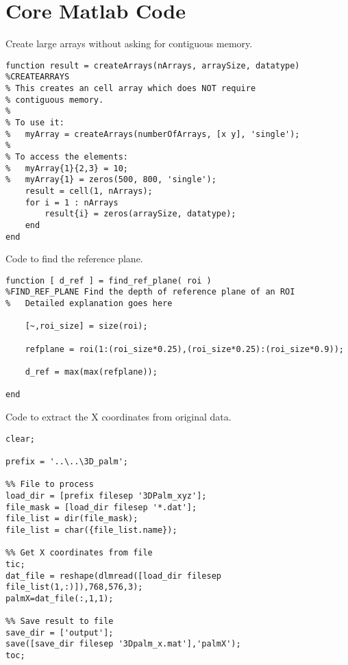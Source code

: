 \chapter{Core Matlab Code\label{ch:code}}

\singlespacing

Create large arrays without asking for contiguous memory.

\begin{verbatim}
function result = createArrays(nArrays, arraySize, datatype)
%CREATEARRAYS
% This creates an cell array which does NOT require
% contiguous memory.
%
% To use it:
%   myArray = createArrays(numberOfArrays, [x y], 'single');
%
% To access the elements:
%   myArray{1}{2,3} = 10;
%   myArray{1} = zeros(500, 800, 'single');
    result = cell(1, nArrays);
    for i = 1 : nArrays
        result{i} = zeros(arraySize, datatype);
    end
end
\end{verbatim}

\clearpage

Code to find the reference plane.

\begin{verbatim}
function [ d_ref ] = find_ref_plane( roi )
%FIND_REF_PLANE Find the depth of reference plane of an ROI
%   Detailed explanation goes here

	[~,roi_size] = size(roi);

	refplane = roi(1:(roi_size*0.25),(roi_size*0.25):(roi_size*0.9));

	d_ref = max(max(refplane));

end
\end{verbatim}

\clearpage

Code to extract the X coordinates from original data.
\begin{verbatim}
clear;

prefix = '..\..\3D_palm';

%% File to process
load_dir = [prefix filesep '3DPalm_xyz'];
file_mask = [load_dir filesep '*.dat'];
file_list = dir(file_mask);
file_list = char({file_list.name});

%% Get X coordinates from file
tic;
dat_file = reshape(dlmread([load_dir filesep file_list(1,:)]),768,576,3);
palmX=dat_file(:,1,1);

%% Save result to file
save_dir = ['output'];
save([save_dir filesep '3Dpalm_x.mat'],'palmX');
toc;
\end{verbatim}

